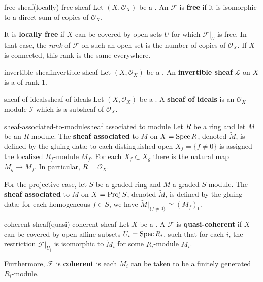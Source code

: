 \begin{topic}{free-sheaf}{(locally) free sheaf}
    Let $(X, \mathcal{O}_X)$ be a . An  $\mathcal{F}$ is \textbf{free} if it is isomorphic to a direct sum of copies of $\mathcal{O}_X$.
    
    It is \textbf{locally free} if $X$ can be covered by open sets $U$ for which $\mathcal{F}|_U$ is free. In that case, the \textit{rank} of $\mathcal{F}$ on such an open set is the number of copies of $\mathcal{O}_X$. If $X$ is connected, this rank is the same everywhere.
\end{topic}

\begin{topic}{invertible-sheaf}{invertible sheaf}
    Let $(X, \mathcal{O}_X)$ be a . An \textbf{invertible sheaf} $\mathcal{L}$ on $X$ is a   of rank 1.
\end{topic}

\begin{topic}{sheaf-of-ideals}{sheaf of ideals}
    Let $(X, \mathcal{O}_X)$ be a . A \textbf{sheaf of ideals} is an $\mathcal{O}_X$-module $\mathcal{I}$ which is a subsheaf of $\mathcal{O}_X$.
\end{topic}

\begin{topic}{sheaf-associated-to-module}{sheaf associated to module}
    Let $R$ be a ring and let $M$ be an $R$-module. The \textbf{sheaf associated} to $M$ on $X = \operatorname{Spec} R$, denoted $\tilde{M}$, is defined by the gluing data: to each distinguished open $X_f = \{ f \ne 0 \}$ is assigned the localized $R_f$-module $M_f$. For each $X_f \subset X_g$ there is the natural map $M_g \to M_f$. In particular, $\tilde{R} = \mathcal{O}_X$.
    
    For the projective case, let $S$ be a graded ring and $M$ a graded $S$-module. The \textbf{sheaf associated} to $M$ on $X = \operatorname{Proj} S$, denoted $\tilde{M}$, is defined by the gluing data: for each homogeneous $f \in S$, we have $\tilde{M}|_{\{ f \ne 0\}} \simeq (M_f)_0$.
\end{topic}

\begin{topic}{coherent-sheaf}{(quasi) coherent sheaf}
    Let $X$ be a . A  $\mathcal{F}$ is \textbf{quasi-coherent} if $X$ can be covered by open affine subsets $U_i = \operatorname{Spec} R_i$, such that for each $i$, the restriction $\mathcal{F}|_{U_i}$ is isomorphic to $\tilde{M}_i$ for some $R_i$-module $M_i$.
    
    Furthermore, $\mathcal{F}$ is \textbf{coherent} is each $M_i$ can be taken to be a finitely generated $R_i$-module.
\end{topic}

